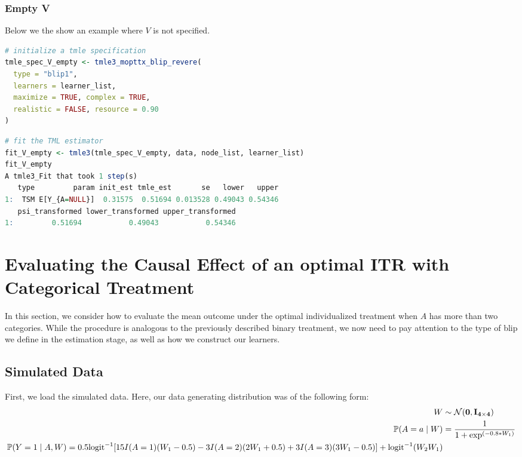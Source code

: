 \documentclass[
  12pt, krantz2,
]{krantz}
\theoremstyle{definition}
\theoremstyle{definition}
\theoremstyle{definition}
\renewcommand{\P}{\mathbb{P}}
\newcommand{\1}{\mathbbm{1}}
\begin{document}
\hypertarget{empty-v}{%
\subsubsection{Empty V}\label{empty-v}}

Below we the show an example where \(V\) is not specified.

\begin{lstlisting}[language=R]
# initialize a tmle specification
tmle_spec_V_empty <- tmle3_mopttx_blip_revere(
  type = "blip1",
  learners = learner_list,
  maximize = TRUE, complex = TRUE,
  realistic = FALSE, resource = 0.90
)
\end{lstlisting}

\begin{lstlisting}[language=R]
# fit the TML estimator
fit_V_empty <- tmle3(tmle_spec_V_empty, data, node_list, learner_list)
fit_V_empty
A tmle3_Fit that took 1 step(s)
   type         param init_est tmle_est       se   lower   upper
1:  TSM E[Y_{A=NULL}]  0.31575  0.51694 0.013528 0.49043 0.54346
   psi_transformed lower_transformed upper_transformed
1:         0.51694           0.49043           0.54346
\end{lstlisting}

\hypertarget{oit-eval-cat}{%
\section{Evaluating the Causal Effect of an optimal ITR with Categorical Treatment}\label{oit-eval-cat}}

In this section, we consider how to evaluate the mean outcome under the optimal
individualized treatment when \(A\) has more than two categories. While the
procedure is analogous to the previously described binary treatment, we now need
to pay attention to the type of blip we define in the estimation stage, as well
as how we construct our learners.

\hypertarget{simulated-data-1}{%
\subsection{Simulated Data}\label{simulated-data-1}}

First, we load the simulated data. Here, our data generating distribution was
of the following form:
\begin{align*}
  W &\sim \mathcal{N}(\bf{0},I_{4 \times 4})\\
  \P(A=a \mid W) &= \frac{1}{1+\exp^{(-0.8*W_1)}}\\
  \P(Y=1 \mid A,W) = 0.5\text{logit}^{-1}[15I(A=1)(W_1-0.5) -
    3I(A=2)(2W_1+0.5) +
    3I(A=3)(3W_1-0.5)] +\text{logit}^{-1}(W_2W_1)
\end{align*}
\end{document}
